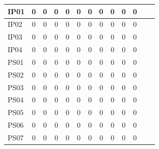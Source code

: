 \documentclass [10pt]{article}
\begin{document}
\begin{longtable}{ | p{}  | c | c | c | c | c | c | c | c | c | c | c | c | }
	IP01 & 0 & 0 & 0 & 0 & 0 & 0 & 0 & 0 & 0 & 0 \\ \hline
	IP02 & 0 & 0 & 0 & 0 & 0 & 0 & 0 & 0 & 0 & 0 \\ \hline
	IP03 & 0 & 0 & 0 & 0 & 0 & 0 & 0 & 0 & 0 & 0 \\ \hline
	IP04 & 0 & 0 & 0 & 0 & 0 & 0 & 0 & 0 & 0 & 0 \\ \hline
	PS01 & 0 & 0 & 0 & 0 & 0 & 0 & 0 & 0 & 0 & 0 \\ \hline
	PS02 & 0 & 0 & 0 & 0 & 0 & 0 & 0 & 0 & 0 & 0 \\ \hline
	PS03 & 0 & 0 & 0 & 0 & 0 & 0 & 0 & 0 & 0 & 0 \\ \hline
	PS04 & 0 & 0 & 0 & 0 & 0 & 0 & 0 & 0 & 0 & 0 \\ \hline
	PS05 & 0 & 0 & 0 & 0 & 0 & 0 & 0 & 0 & 0 & 0 \\ \hline
	PS06 & 0 & 0 & 0 & 0 & 0 & 0 & 0 & 0 & 0 & 0 \\ \hline
	PS07 & 0 & 0 & 0 & 0 & 0 & 0 & 0 & 0 & 0 & 0 \\ \hline
\end{longtable}
\end{document}
